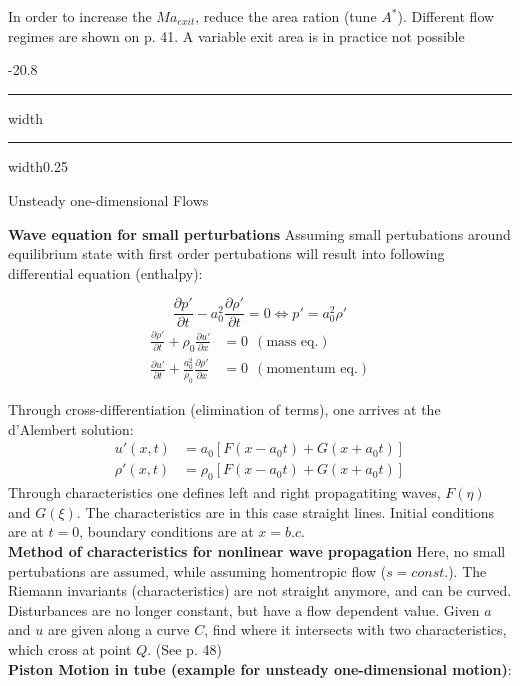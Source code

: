 \documentclass[8pt, landscape, fleqn]{scrartcl}
\makeatletter
\renewcommand{\section}{\@startsection{section}{1}{0mm}%
{-2\baselineskip}{0.8\baselineskip}%
{\hrule depth 0.2pt width\columnwidth\hrule depth1.5pt
width0.25\columnwidth\vspace*{1.2em}\Large\bfseries\rmfamily}}
\makeatother
\begin{document}
\begin{multicols*}{3}
In order to increase the $Ma_{exit}$, reduce the area ration (tune $A^*$). Different flow regimes are shown on p. 41. A variable exit area is in practice not possible

\section{Unsteady one-dimensional Flows}

\textbf{Wave equation for small perturbations}
Assuming small pertubations around equilibrium state with first order pertubations will result into following differential equation (enthalpy):

\begin{equation*}
    \frac{\partial p'}{\partial t} - a_0^2 \frac{\partial \rho'}{\partial t} = 0 \Longleftrightarrow p' = a_0^2 \rho'
\end{equation*}
\begin{align*}
    \frac{\partial \rho'}{\partial t} + \rho_0 \frac{\partial u'}{\partial x} &= 0 ~~ (\text{mass eq.}) \\
    \frac{\partial u'}{\partial t} + \frac{a_0^2}{\rho_0} \frac{\partial \rho'}{\partial x} &= 0 ~~ (\text{momentum eq.})
\end{align*}

Through cross-differentiation (elimination of terms), one arrives at the d'Alembert solution:
\begin{align*}
    u'(x,t) &= a_0 [F(x-a_0t) + G(x+a_0t)] \\
    \rho'(x,t) &= \rho_0 [F(x-a_0t) + G(x+a_0t)]
\end{align*}
Through characteristics one defines left and right propagatiting waves, $F(\eta)$ and $G(\xi)$. The characteristics are in this case straight lines. Initial conditions are at $t=0$, boundary conditions are at $x=b.c.$ \\

\textbf{Method of characteristics for nonlinear wave propagation}
Here, no small pertubations are assumed, while assuming homentropic flow ($s=const.$). The Riemann invariants (characteristics) are not straight anymore, and can be curved. Disturbances are no longer constant, but have a flow dependent value. Given $a$ and $u$ are given along a curve $C$, find where it intersects with two characteristics, which cross at point $Q$. (See p. 48) \\ 

\textbf{Piston Motion in tube (example for unsteady one-dimensional motion)}:


\end{multicols*}
\end{document}
